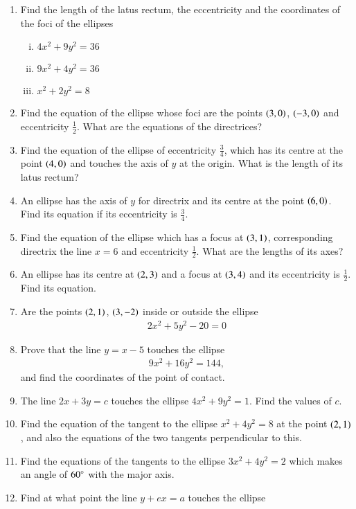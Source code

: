 \begin{enumerate}[1.]
\item Find the length of the latus rectum, the eccentricity and the coordinates of the
foci of the ellipses
\begin{enumerate}[(i)]
\item 
$
4x^2+9y^2=36
$
\item 
$
9x^2+4y^2=36
$
\item
$
x^2+2y^2=8
$
\end{enumerate}
\item Find the equation of the ellipse whose foci are the points $\left(3,0\right)$,  $\left(-3,0\right)$
and eccentricity $\frac{1}{2}$.  What are the equations of the directrices?
\item Find the equation of the ellipse of eccentricity $\frac{3}{4}$, which has its centre at the point $\left(4,0\right)$ and touches the axis of $y$ at the
origin.  What is the length of its latus rectum?
\item An ellipse has the axis of $y$ for directrix and its centre at the point $\left(6,0\right)$.   Find its 
equation if its eccentricity is $\frac{3}{4}$.
\item Find the equation of the ellipse which has a focus at $\left(3,1\right)$, corresponding directrix the line $x=6$ and
eccentricity $\frac{1}{2}$.  What are the lengths of its axes?
\item An ellipse has its centre at $\left(2,3\right)$ and a focus at $\left(3,4\right)$ and its eccentricity is $\frac{1}{2}$.  Find its equation.
\item Are the points $\left(2,1\right)$, $\left(3,-2\right)$ inside or outside the ellipse
\begin{align*}
2x^2+5y^2-20 = 0
\end{align*}
\item Prove that the line $y=x-5$ touches the ellipse
\begin{align*}
9x^2+16y^2=144,
\end{align*}
and find the coordinates of the point of contact.
\item The line $2x+3y=c$ touches the ellipse $4x^2+9y^2=1$.  Find the values of $c$.
\item Find the equation of the tangent to the ellipse $x^2+4y^2=8$ at the point $\left(2,1\right)$, and also the equations of the two tangents perpendicular to this.
\item Find the equations of the tangents to the ellipse $3x^2+4y^2=2$ which makes an angle of $60\degree$ with the major axis.
\item Find at what point the line $y+ex=a$ touches the ellipse

\end{enumerate}
